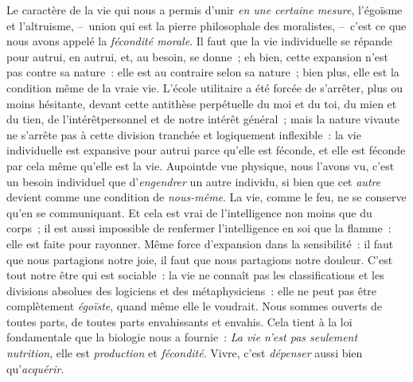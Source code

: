 \documentclass[french,twoside]{book} %
\begin{document}
Le caractère de la vie qui nous a permis d’unir \emph{en une certaine mesure}, l’égoïsme et l’altruisme, – union qui est la pierre philosophale des moralistes, – c’est ce que nous avons appelé la \emph{fécondité morale}. Il faut que la vie individuelle se répande pour autrui, en autrui, et, au besoin, se donne ; eh bien, cette expansion n’est pas contre sa nature : elle est au contraire selon sa nature ; bien plus, elle est la condition même de la vraie vie. L’école utilitaire a été forcée de s’arrêter, plus ou moins hésitante, devant cette antithèse perpétuelle du moi et du toi, du mien et du tien, de l’intérêtpersonnel et de notre intérêt général ; mais la nature vivaute ne s’arrête pas à cette division tranchée et logiquement inflexible : la vie individuelle est expansive pour autrui parce qu’elle est féconde, et elle est féconde par cela même qu’elle est la vie. Aupointde vue physique, nous l’avons vu, c’est un besoin individuel que d’\emph{engendrer} un autre individu, si bien que cet \emph{autre} devient comme une condition de \emph{nous-même}. La vie, comme le feu, ne se conserve qu’en se communiquant. Et cela est vrai de l’intelligence non moins que du corps ; il est aussi impossible de renfermer l’intelligence en soi que la flamme : elle est faite pour rayonner. Même force d’expansion dans la sensibilité : il faut que nous partagions notre joie, il faut que nous partagions notre douleur. C’est tout notre être qui est sociable : la vie ne connaît pas les classifications et les divisions absolues des logiciens et des métaphysiciens : elle ne peut pas être complètement \emph{égoïste}, quand même elle le voudrait. Nous sommes ouverts de toutes parts, de toutes parts envahissants et envahis. Cela tient à la loi fondamentale que la biologie nous a fournie : \emph{La vie n’est pas seulement nutrition}, elle est \emph{production} et \emph{fécondité}. Vivre, c’est \emph{dépenser} aussi bien qu’\emph{acquérir}.\par
\end{document}

